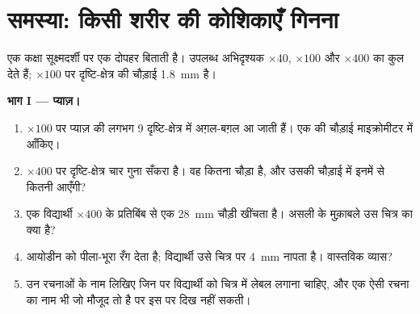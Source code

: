 \section{समस्या: किसी शरीर की कोशिकाएँ गिनना}

\begin{problem}
\label{pb:g10:cells-common-unit:1}
एक कक्षा सूक्ष्मदर्शी पर एक दोपहर बिताती है। उपलब्ध अभिदृश्यक $\times 40$,
$\times 100$ और $\times 400$ का कुल  देते हैं; $\times 100$ पर
दृष्टि-क्षेत्र की चौड़ाई \qty{1.8}{mm} है।

\medskip
\noindent\textbf{भाग I --- प्याज़।}
\begin{enumerate}
  \item $\times 100$ पर प्याज़ की लगभग 9  दृष्टि-क्षेत्र में
        अग़ल-बग़ल आ जाती हैं। एक  की चौड़ाई माइक्रोमीटर में
        आँकिए।
  \item $\times 400$ पर दृष्टि-क्षेत्र चार गुना सँकरा है। वह कितना चौड़ा
        है, और उसकी चौड़ाई में इनमें से कितनी  आएँगी?
  \item एक विद्यार्थी $\times 400$ के प्रतिबिंब से एक 
        \qty{28}{mm} चौड़ी खींचता है। असली  के मुक़ाबले उस चित्र
        का  क्या है?
  \item आयोडीन  को पीला-भूरा रँग देता है; विद्यार्थी उसे चित्र पर
        \qty{4}{mm} नापता है। वास्तविक व्यास?
  \item उन रचनाओं के नाम लिखिए जिन पर विद्यार्थी को चित्र में लेबल लगाना
        चाहिए, और एक ऐसी रचना का नाम भी जो मौजूद तो है पर इस  पर
        दिख नहीं सकती।
\end{enumerate}


\end{problem}
